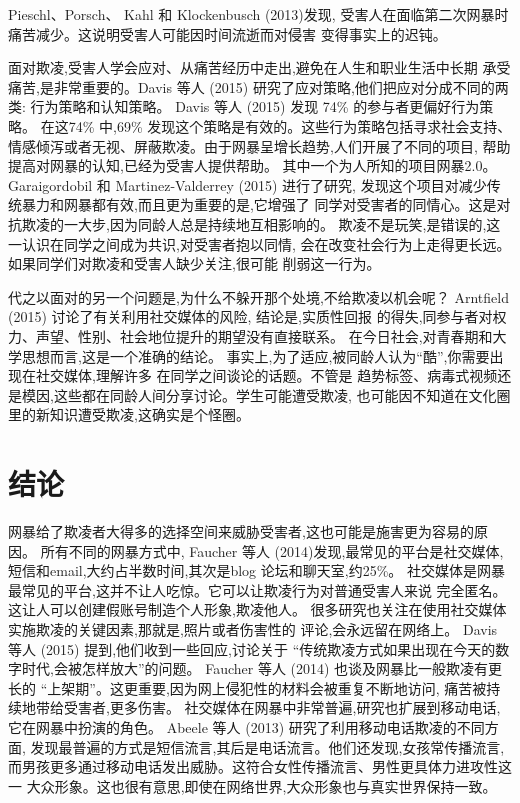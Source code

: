 \documentclass[a4paper]{article}
\begin{document}
Pieschl、Porsch、 Kahl 和 Klockenbusch (2013)\cite{pieschl2013}发现,
受害人在面临第二次网暴时痛苦减少。这说明受害人可能因时间流逝而对侵害
变得事实上的迟钝。

面对欺凌,受害人学会应对、从痛苦经历中走出,避免在人生和职业生活中长期
承受痛苦,是非常重要的。Davis 等人 (2015)\cite{davis2015}
研究了应对策略,他们把应对分成不同的两类:
行为策略和认知策略。
Davis 等人 (2015)\cite{davis2015} 发现 74\% 的参与者更偏好行为策略。
在这74\% 中,69\% 发现这个策略是有效的。这些行为策略包括寻求社会支持、
情感倾泻或者无视、屏蔽欺凌。由于网暴呈增长趋势,人们开展了不同的项目,
帮助提高对网暴的认知,已经为受害人提供帮助。
其中一个为人所知的项目网暴2.0。
Garaigordobil 和 Martinez-Valderrey (2015)\cite{gara2015} 进行了研究,
发现这个项目对减少传统暴力和网暴都有效,而且更为重要的是,它增强了
同学对受害者的同情心。这是对抗欺凌的一大步,因为同龄人总是持续地互相影响的。
欺凌不是玩笑,是错误的,这一认识在同学之间成为共识,对受害者抱以同情,
会在改变社会行为上走得更长远。如果同学们对欺凌和受害人缺少关注,很可能
削弱这一行为。

代之以面对的另一个问题是,为什么不躲开那个处境,不给欺凌以机会呢？
Arntfield (2015)\cite{arntfield2015} 讨论了有关利用社交媒体的风险,
结论是,实质性回报
的得失,同参与者对权力、声望、性别、社会地位提升的期望没有直接联系。
在今日社会,对青春期和大学思想而言,这是一个准确的结论。
事实上,为了适应,被同龄人认为``酷'',你需要出现在社交媒体,理解许多
在同学之间谈论的话题。不管是
趋势标签、病毒式视频还是模因,这些都在同龄人间分享讨论。学生可能遭受欺凌,
也可能因不知道在文化圈里的新知识遭受欺凌,这确实是个怪圈。

\section{结论}
网暴给了欺凌者大得多的选择空间来威胁受害者,这也可能是施害更为容易的原因。
所有不同的网暴方式中,
Faucher 等人 (2014)\cite{faucher2014}发现,最常见的平台是社交媒体,
短信和email,大约占半数时间,其次是blog 论坛和聊天室,约25\%。
社交媒体是网暴最常见的平台,这并不让人吃惊。它可以让欺凌行为对普通受害人来说
完全匿名。这让人可以创建假账号制造个人形象,欺凌他人。
很多研究也关注在使用社交媒体实施欺凌的关键因素,那就是,照片或者伤害性的
评论,会永远留在网络上。
Davis 等人 (2015)\cite{davis2015} 提到,他们收到一些回应,讨论关于
``传统欺凌方式如果出现在今天的数字时代,会被怎样放大''的问题。
Faucher 等人 (2014)\cite{faucher2014} 也谈及网暴比一般欺凌有更长的
``上架期''。这更重要,因为网上侵犯性的材料会被重复不断地访问,
痛苦被持续地带给受害者,更多伤害。
社交媒体在网暴中非常普遍,研究也扩展到移动电话,它在网暴中扮演的角色。
Abeele 等人 (2013)\cite{abeele2013} 研究了利用移动电话欺凌的不同方面,
发现最普遍的方式是短信流言,其后是电话流言。他们还发现,女孩常传播流言,
而男孩更多通过移动电话发出威胁。这符合女性传播流言、男性更具体力进攻性这一
大众形象。这也很有意思,即使在网络世界,大众形象也与真实世界保持一致。




\end{document}
